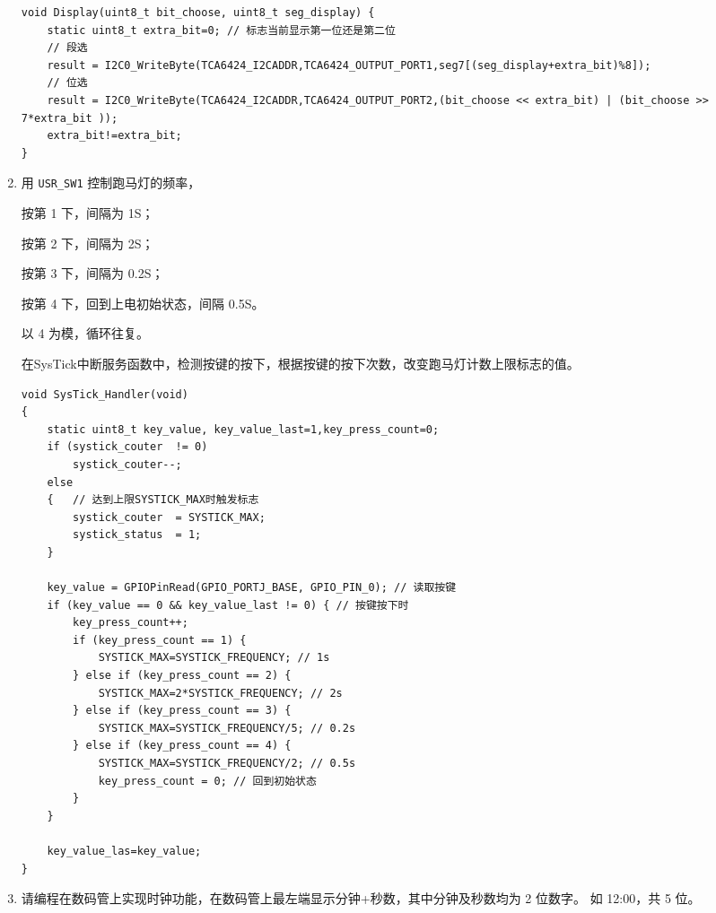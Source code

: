 \documentclass[12pt, a4paper, oneside]{ctexart}
\begin{document}
\begin{enumerate}[listparindent=2em]
    \begin{lstlisting}
void Display(uint8_t bit_choose, uint8_t seg_display) {
    static uint8_t extra_bit=0; // 标志当前显示第一位还是第二位
    // 段选	
    result = I2C0_WriteByte(TCA6424_I2CADDR,TCA6424_OUTPUT_PORT1,seg7[(seg_display+extra_bit)%8]); 
    // 位选
    result = I2C0_WriteByte(TCA6424_I2CADDR,TCA6424_OUTPUT_PORT2,(bit_choose << extra_bit) | (bit_choose >> 7*extra_bit ));
    extra_bit!=extra_bit; 
}
    \end{lstlisting}

        \item 用 \verb|USR_SW1| 控制跑马灯的频率，
        
        按第 1 下，间隔为 1S；
        
        按第 2 下，间隔为 2S；

        按第 3 下，间隔为 0.2S；
        
        按第 4 下，回到上电初始状态，间隔 0.5S。
        
        以 4 为模，循环往复。

        {\kaishu 在SysTick中断服务函数中，检测按键的按下，根据按键的按下次数，改变跑马灯计数上限标志的值。}

        \begin{lstlisting}
void SysTick_Handler(void)
{
    static uint8_t key_value, key_value_last=1,key_press_count=0;
    if (systick_couter	!= 0)
	    systick_couter--;
    else
    {   // 达到上限SYSTICK_MAX时触发标志
	    systick_couter	= SYSTICK_MAX; 
	    systick_status 	= 1;
    }

    key_value = GPIOPinRead(GPIO_PORTJ_BASE, GPIO_PIN_0); // 读取按键
    if (key_value == 0 && key_value_last != 0) { // 按键按下时
        key_press_count++;
        if (key_press_count == 1) {
            SYSTICK_MAX=SYSTICK_FREQUENCY; // 1s
        } else if (key_press_count == 2) {
            SYSTICK_MAX=2*SYSTICK_FREQUENCY; // 2s
        } else if (key_press_count == 3) {
            SYSTICK_MAX=SYSTICK_FREQUENCY/5; // 0.2s
        } else if (key_press_count == 4) {
            SYSTICK_MAX=SYSTICK_FREQUENCY/2; // 0.5s
            key_press_count = 0; // 回到初始状态
        }
    } 

    key_value_las=key_value;
}
        \end{lstlisting}

        \item 请编程在数码管上实现时钟功能，在数码管上最左端显示分钟+秒数，其中分钟及秒数均为 2 位数字。
        如 12:00，共 5 位。
        

\end{enumerate}
\end{document}
